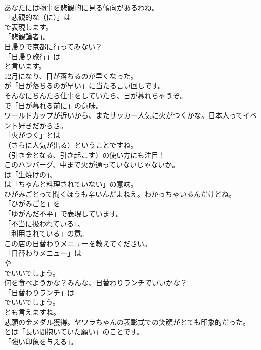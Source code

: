 \documentclass[8pt]{extreport}
\begin{document}
\begin{CJK}{UTF8}{min}
\\	あなたには物事を悲観的に見る傾向があるわね。 
\\	「悲観的な（に）」は
\\	で表現します。
\\	「悲観論者」。	
\\	日帰りで京都に行ってみない？ 
\\	「日帰り旅行」は
\\	と言います。	
\\	12月になり、日が落ちるのが早くなった。 
\\	が「日が落ちるのが早い」に当たる言い回しです。	
\\	そんなにちんたら仕事をしていたら、日が暮れちゃうぞ。 
\\	で「日が暮れる前に」の意味。	
\\	ワールドカップが近いから、またサッカー人気に火がつくかな。日本人ってイベント好きだからさ。 
\\	「火がつく」とは 
\\	（さらに人気が出る）ということですね。
\\	（引き金となる、引き起こす）の使い方にも注目！	
\\	このハンバーグ、中まで火が通っていないじゃないか。 
\\	は「生焼けの」、
\\	は「ちゃんと料理されていない」の意味。	
\\	ひがみごとって聞くほうも辛いんだよねえ。わかっちゃいるんだけどね。 
\\	「ひがみごと」を
\\	「ゆがんだ不平」で表現しています。
\\	「不当に扱われている」、
\\	「利用されている」の意。	
\\	この店の日替わりメニューを教えてください。 
\\	「日替わりメニュー」は 
\\	や 
\\	でいいでしょう。	
\\	何を食べようかな？みんな、日替わりランチでいいかな？ 
\\	「日替わりランチ」は 
\\	でいいでしょう。
\\	とも言えますね。	
\\	悲願の金メダル獲得。ヤワラちゃんの表彰式での笑顔がとても印象的だった。 
\\	とは「長い間抱いていた願い」のことです。
\\	「強い印象を与える」。	

\end{CJK}
\end{document}
